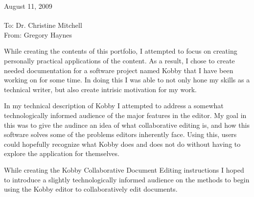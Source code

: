 \documentclass[11pt]{memo}
\begin{document}
August 11, 2009 \\
\\
To: Dr. Christine Mitchell \\
From: Gregory Haynes \\

\begin{memo}

While creating the contents of this portfolio, I attempted to focus on creating personally practical applications of the content.  As a result, I chose to create needed documentation for a software project named Kobby that I have been working on for some time.  In doing this I was able to not only hone my skills as a technical writer, but also create intrisic motivation for my work.

In my technical description of Kobby I attempted to address a somewhat technologically informed audience of the major features in the editor.  My goal in this was to give the audince an idea of what collaborative editing is, and how this software solves some of the problems editors inherently face.  Using this, users could hopefully recognize what Kobby does and does not do without having to explore the application for themselves.

While creating the Kobby Collaborative Document Editing instructions I hoped to introduce a slightly technologically informed audience on the methods to begin using the Kobby editor to collaboratively edit documents.

\end{memo}
\end{document}
